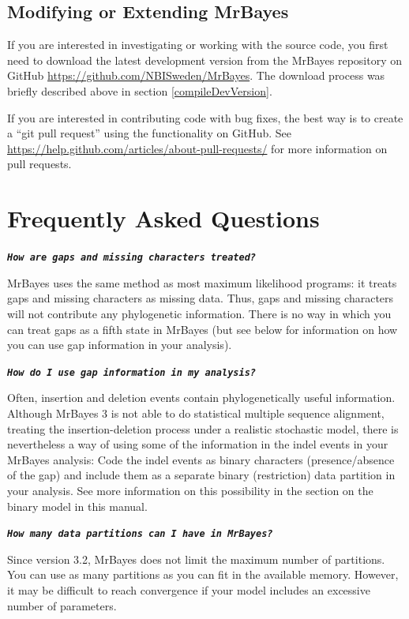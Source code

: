 \documentclass[12pt]{book}
\newcommand{\ttt}[1]{\texttt{#1}}
\newcommand{\tb}[1]{\ttt{\textbf{#1}}}
\begin{document}
\subsection{Modifying or Extending MrBayes}

If you are interested in investigating or working with the source code, you first need to download
the latest development version from the MrBayes repository on GitHub
\url{https://github.com/NBISweden/MrBayes}. The download process was briefly described above in
section \ref{compileDevVersion}.

If you are interested in contributing code with bug fixes, the best way is to create a ``git pull
request'' using the functionality on GitHub. See
\url{https://help.github.com/articles/about-pull-requests/} for more information on pull requests.


\section{Frequently Asked Questions}
\label{FAQ}

\tb{\it{How are gaps and missing characters treated?}}

MrBayes uses the same method as most maximum likelihood programs: it treats gaps and missing
characters as missing data. Thus, gaps and missing characters will not contribute any phylogenetic
information. There is no way in which you can treat gaps as a fifth state in MrBayes (but see below
for information on how you can use gap information in your analysis).

\tb{\it{How do I use gap information in my analysis?}}

Often, insertion and deletion events contain phylogenetically useful information. Although MrBayes
3 is not able to do statistical multiple sequence alignment, treating the insertion-deletion
process under a realistic stochastic model, there is nevertheless a way of using some of the
information in the indel events in your MrBayes analysis: Code the indel events as binary
characters (presence/absence of the gap) and include them as a separate binary (restriction) data
partition in your analysis. See more information on this possibility in the section on the binary
model in this manual.

\tb{\it{How many data partitions can I have in MrBayes?}}

Since version 3.2, MrBayes does not limit the maximum number of partitions. You can use as many
partitions as you can fit in the available memory. However, it may be difficult to reach
convergence if your model includes an excessive number of parameters.
\end{document}
